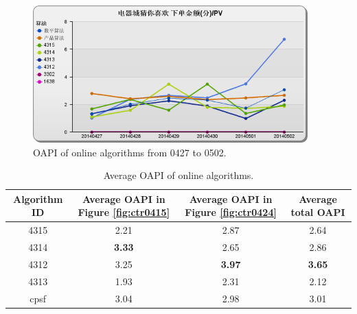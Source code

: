 \begin{figure}
\begin{center}



\includegraphics[width=400px]{fig/yixunexp/OAPI0427.png}
\caption{\label{fig:oapi0427} OAPI of online algorithms  from 0427 to 0502.}
\end{center}
\end{figure}





\begin{table}[h]


\begin{center}
\begin{tabular}{| c | c | c | c |}
\hline
Algorithm ID & Average OAPI in Figure \ref{fig:ctr0415} & Average OAPI in Figure \ref{fig:ctr0424} & Average total OAPI \\
\hline
4315 &2.21 & 2.87 & 2.64\\
\hline
4314 &\textbf{3.33} & 2.65& 2.86\\
\hline
4312 &3.25& \textbf{3.97}& \textbf{3.65}\\
\hline
4313 & 1.93 & 2.31& 2.12\\
\hline
cpsf & 3.04& 2.98 & 3.01\\
\hline
\end{tabular}
\caption{\label{tbl:cvravg} Average OAPI of online algorithms.}
\end{center}
\end{table}

